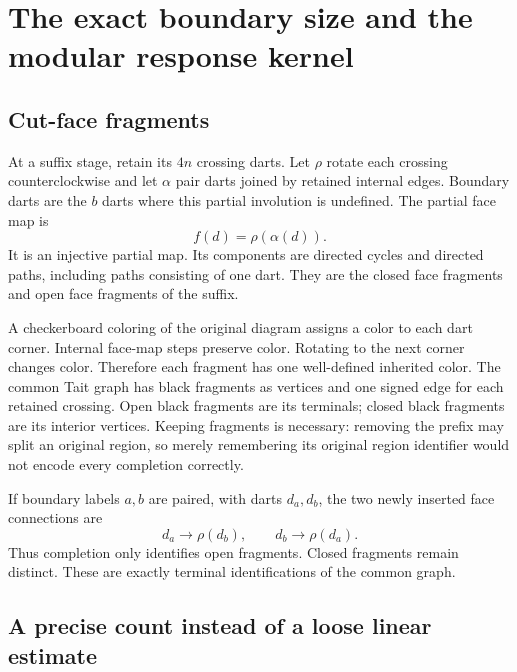 \section{The exact boundary size and the modular response kernel}
\label{sec:geometry}

\subsection{Cut-face fragments}

At a suffix stage, retain its $4n$ crossing darts. Let $\rho$ rotate each
crossing counterclockwise and let $\alpha$ pair darts joined by retained
internal edges. Boundary darts are the $b$ darts where this partial involution
is undefined. The partial face map is
\[
                           f(d)=\rho(\alpha(d)).
\]
It is an injective partial map. Its components are directed cycles and directed
paths, including paths consisting of one dart. They are the closed face
fragments and open face fragments of the suffix.

A checkerboard coloring of the original diagram assigns a color to each dart
corner. Internal face-map steps preserve color. Rotating to the next corner
changes color. Therefore each fragment has one well-defined inherited color.
The common Tait graph has black fragments as vertices and one signed edge for
each retained crossing. Open black fragments are its terminals; closed black
fragments are its interior vertices. Keeping fragments is necessary: removing
the prefix may split an original region, so merely remembering its original
region identifier would not encode every completion correctly.

If boundary labels $a,b$ are paired, with darts $d_a,d_b$, the two newly inserted
face connections are
\begin{equation}
           d_a\longrightarrow\rho(d_b),\qquad
           d_b\longrightarrow\rho(d_a).
 \label{eq:face-glue}
\end{equation}
Thus completion only identifies open fragments. Closed fragments remain
distinct. These are exactly terminal identifications of the common graph.

\subsection{A precise count instead of a loose linear estimate}

